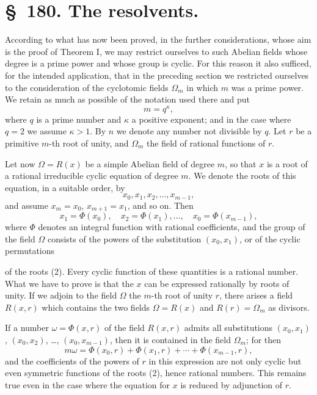 \documentclass[11pt]{article}
\newcommand{\Om}{\Omega}
\begin{document}
\section*{\S~180. The resolvents.}

According to what has now been proved, in the further considerations, whose aim is the proof of Theorem I, we may restrict ourselves to such Abelian fields whose degree is a prime power and whose group is cyclic. For this reason it also sufficed, for the intended application, that in the preceding section we restricted ourselves to the consideration of the cyclotomic fields $\Omega_m$ in which $m$ was a prime power. We retain as much as possible of the notation used there and put
\begin{equation}
  m=q^\kappa,
\tag{1}
\end{equation}
where $q$ is a prime number and $\kappa$ a positive exponent; and in the case where $q=2$ we assume $\kappa>1$. By $n$ we denote any number not divisible by $q$. Let $r$ be a primitive $m$-th root of unity, and $\Omega_m$ the field of rational functions of $r$.

Let now $\Om=R(x)$ be a simple Abelian field of degree $m$, so that $x$ is a root of a rational irreducible cyclic equation of degree $m$. We denote the roots of this equation, in a suitable order, by
\begin{equation}
  x_0,x_1,x_2,\ldots,x_{m-1},
\tag{2}
\end{equation}
and assume $x_m=x_0$, $x_{m+1}=x_1$, and so on. Then
\[
  x_1=\Phi(x_0),\quad x_2=\Phi(x_1),\ldots,\quad x_0=\Phi(x_{m-1}),
\]
where $\Phi$ denotes an integral function with rational coefficients, and the group of the field $\Om$ consists of the powers of the substitution $(x_0,x_1)$, or of the cyclic permutations

of the roots (2). Every cyclic function of these quantities is a rational number. What we have to prove is that the $x$ can be expressed rationally by roots of unity. If we adjoin to the field $\Om$ the $m$-th root of unity $r$, there arises a field $R(x,r)$ which contains the two fields $\Om=R(x)$ and $R(r)=\Omega_m$ as divisors.

If a number $\omega=\Phi(x,r)$ of the field $R(x,r)$ admits all substitutions $(x_0,x_1)$, $(x_0,x_2)$, \ldots, $(x_0,x_{m-1})$, then it is contained in the field $\Omega_m$; for then
\[
  m\omega=\Phi(x_0,r)+\Phi(x_1,r)+\cdots+\Phi(x_{m-1},r),
\]
and the coefficients of the powers of $r$ in this expression are not only cyclic but even symmetric functions of the roots (2), hence rational numbers. This remains true even in the case where the equation for $x$ is reduced by adjunction of $r$.
\end{document}
